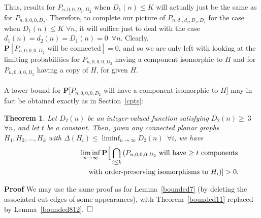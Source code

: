 \documentclass{article}
\newtheorem{Theorem}{Theorem}
\newtheorem{Proof of Theorem}{Proof of Theorem}
\begin{document}
\phantom{p}















Thus, results for $P_{n,0,0,D_{1},D_{2}}$ when $D_{1}(n) \leq K$ will actually just be the same as for $P_{n,0,0,0,D_{2}}$.
Therefore, to complete our picture of $P_{n,d_{1},d_{2},D_{1},D_{2}}$ for the case when $D_{1}(n) \leq K$ $\forall n$,
it will suffice just to deal with the case $d_{1}(n)=d_{2}(n)=D_{1}(n)=0$~$\forall n$.
Clearly, $\mathbf{P}[P_{n,0,0,0,D_{2}} \textrm{ will be connected}]=0$,
and so we are only left with looking at the limiting probabilities for
$P_{n,0,0,0,D_{2}}$ having a component isomorphic to $H$
and for $P_{n,0,0,0,D_{2}}$ having a copy of $H$,
for given $H$. \\
\\















A lower bound for $\mathbf{P}[P_{n,0,0,0,D_{2}}$ will have a component isomorphic to $H]$
may in fact be obtained exactly as in Section~\ref{cpts}:















\begin{Theorem} \label{bounded803}
Let $D_{2}(n)$ be an integer-valued function satisfying $D_{2}(n) \geq\!~\!\!3$~$\forall n$,
and let $t$ be a constant.
Then, given any connected planar graphs
$H_{1},H_{2}, \ldots, H_{k}$ 
with
$\Delta(H_{i}) \leq \liminf_{n \to \infty} D_{2}(n)$~$\forall i$,
we have
\begin{eqnarray*}
& & \liminf_{n \to \infty}
\mathbf{P}
\Big[\bigcap_{i \leq k} \left(\textrm{$P_{n,0,0,0,D_{2}}$ 
will have $\geq t$ components}\right. \\
& & \textrm{\phantom{wwwwwwwwwww}with order-preserving isomorphisms to $H_{i}$} ) ] 
> 0.
\end{eqnarray*}
\end{Theorem}
\textbf{Proof}
We may use the same proof as for Lemma~\ref{bounded7}
(by deleting the associated cut-edges of some appearances),
with Theorem~\ref{bounded11} replaced by Lemma~\ref{bounded812}.~$
\setlength{\unitlength}{.25cm}
\begin{picture}(1,1)
\put(0,0){\line(1,0){1}}
\put(0,0){\line(0,1){1}}
\put(1,1){\line(-1,0){1}}
\put(1,1){\line(0,-1){1}}
\end{picture}$ 
\end{document}
